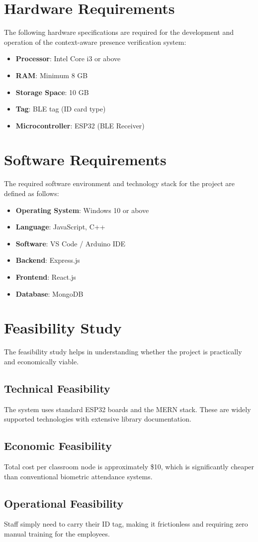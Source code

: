 \section{Hardware Requirements}
The following hardware specifications are required for the development and operation of the context-aware presence verification system:
\begin{itemize}
    \item \textbf{Processor}: Intel Core i3 or above
    \item \textbf{RAM}: Minimum 8 GB
    \item \textbf{Storage Space}: 10 GB
    \item \textbf{Tag}: BLE tag (ID card type)
    \item \textbf{Microcontroller}: ESP32 (BLE Receiver)
\end{itemize}

\section{Software Requirements}
The required software environment and technology stack for the project are defined as follows:
\begin{itemize}
    \item \textbf{Operating System}: Windows 10 or above
    \item \textbf{Language}: JavaScript, C++
    \item \textbf{Software}: VS Code / Arduino IDE
    \item \textbf{Backend}: Express.js
    \item \textbf{Frontend}: React.js
    \item \textbf{Database}: MongoDB
\end{itemize}

\section{Feasibility Study}
The feasibility study helps in understanding whether the project is practically and economically viable.

\subsection{Technical Feasibility}
The system uses standard ESP32 boards and the MERN stack. These are widely supported technologies with extensive library documentation. 
\subsection{Economic Feasibility}
Total cost per classroom node is approximately \$10, which is significantly cheaper than conventional biometric attendance systems.
\subsection{Operational Feasibility}
Staff simply need to carry their ID tag, making it frictionless and requiring zero manual training for the employees.
